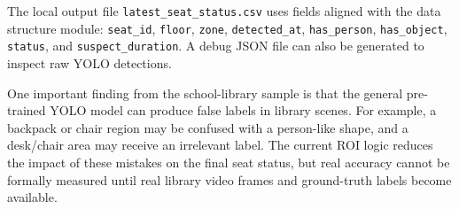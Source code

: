 The local output file \texttt{latest\_seat\_status.csv} uses fields aligned with the data structure module: \texttt{seat\_id}, \texttt{floor}, \texttt{zone}, \texttt{detected\_at}, \texttt{has\_person}, \texttt{has\_object}, \texttt{status}, and \texttt{suspect\_duration}. A debug JSON file can also be generated to inspect raw YOLO detections.

One important finding from the school-library sample is that the general pre-trained YOLO model can produce false labels in library scenes. For example, a backpack or chair region may be confused with a person-like shape, and a desk/chair area may receive an irrelevant label. The current ROI logic reduces the impact of these mistakes on the final seat status, but real accuracy cannot be formally measured until real library video frames and ground-truth labels become available.

